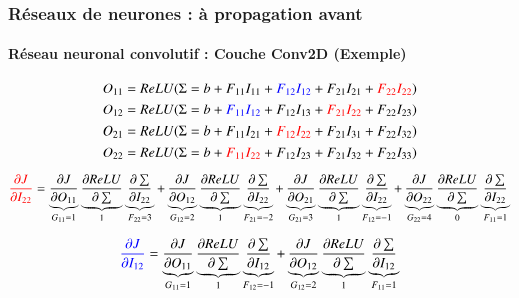 \documentclass[xcolor=table]{beamer}
\begin{document}
\begin{frame}
	\frametitle{Réseaux de neurones : à propagation avant}
	\framesubtitle{Réseau neuronal convolutif : Couche Conv2D (Exemple)}
	
	
	\begin{center}
		\vskip-6pt
	\end{center}\vskip-16pt

	{\scriptsize 
		\[O_{11} = ReLU(\Sigma = b + F_{11} I_{11} + \textcolor{blue}{F_{12} I_{12}} + F_{21} I_{21} + \textcolor{red}{F_{22} I_{22}})  \]
		\[O_{12} = ReLU(\Sigma = b + \textcolor{blue}{F_{11} I_{12}} + F_{12} I_{13} + \textcolor{red}{F_{21} I_{22}} + F_{22} I_{23})  \]
		\[O_{21} = ReLU(\Sigma = b + F_{11} I_{21} + \textcolor{red}{F_{12} I_{22}} + F_{21} I_{31} + F_{22} I_{32})  \]
		\[O_{22} = ReLU(\Sigma = b + \textcolor{red}{F_{11} I_{22}} + F_{12} I_{23} + F_{21} I_{32} + F_{22} I_{33})  \]
	    	
	    \[\textcolor{red}{\frac{\partial J}{\partial I_{22}}} 
		= \underbrace{\frac{\partial J}{\partial O_{11}}}_{G_{11} = 1} 
		\underbrace{\frac{\partial ReLU}{\partial \sum}}_{1} 
		\underbrace{\frac{\partial \sum}{\partial I_{22}}}_{F_{22} = 3}
		+ \underbrace{\frac{\partial J}{\partial O_{12}}}_{G_{12} = 2} 
		\underbrace{\frac{\partial ReLU}{\partial \sum}}_{1} 
		\underbrace{\frac{\partial \sum}{\partial I_{22}}}_{F_{21} = -2}
		+ \underbrace{\frac{\partial J}{\partial O_{21}}}_{G_{21} = 3} 
		\underbrace{\frac{\partial ReLU}{\partial \sum}}_{1} 
		\underbrace{\frac{\partial \sum}{\partial I_{22}}}_{F_{12} = -1}
		+ \underbrace{\frac{\partial J}{\partial O_{22}}}_{G_{22} = 4} 
		\underbrace{\frac{\partial ReLU}{\partial \sum}}_{0} 
		\underbrace{\frac{\partial \sum}{\partial I_{22}}}_{F_{11} = 1}\]
		
		\[\textcolor{blue}{\frac{\partial J}{\partial I_{12}}} 
		= \underbrace{\frac{\partial J}{\partial O_{11}}}_{G_{11} = 1} 
		\underbrace{\frac{\partial ReLU}{\partial \sum}}_{1} 
		\underbrace{\frac{\partial \sum}{\partial I_{12}}}_{F_{12} = -1}
		+ \underbrace{\frac{\partial J}{\partial O_{12}}}_{G_{12} = 2} 
		\underbrace{\frac{\partial ReLU}{\partial \sum}}_{1} 
		\underbrace{\frac{\partial \sum}{\partial I_{12}}}_{F_{11} = 1}\]
	}

\end{frame}
\end{document}
